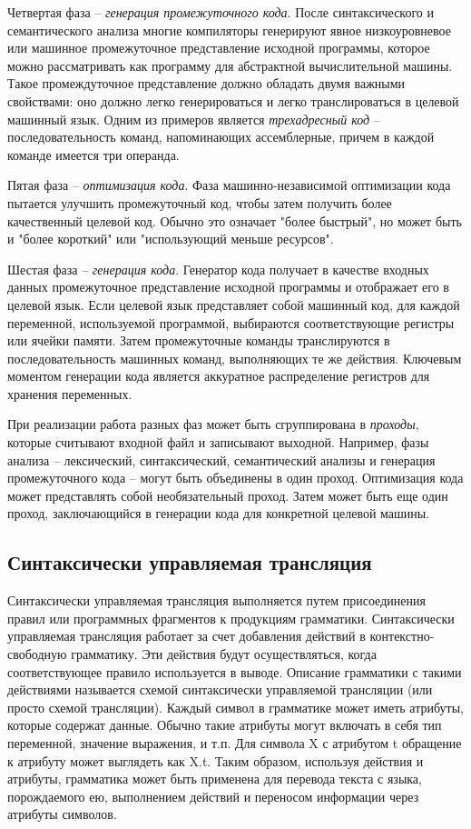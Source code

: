 \documentclass[a4paper,12pt]{article}
\begin{document}
Четвертая фаза -- \textit{генерация промежуточного кода}. После синтаксического и семантического анализа многие компиляторы генерируют явное низкоуровневое или машинное промежуточное представление исходной программы, которое можно рассматривать как программу для абстрактной вычислительной машины. Такое промеждуточное представление должно обладать двумя важными свойствами: оно должно легко генерироваться и легко транслироваться в целевой машинный язык. Одним из примеров является \textit{трехадресный код} -- последовательность команд, напоминающих ассемблерные, причем в каждой команде имеется три операнда.

Пятая фаза -- \textit{оптимизация кода}. Фаза машинно-независимой оптимизации кода пытается улучшить промежуточный код, чтобы затем получить более качественный целевой код. Обычно это означает "более быстрый", но может быть и "более короткий" или "использующий меньше ресурсов".

Шестая фаза -- \textit{генерация кода}. Генератор кода получает в качестве входных данных промежуточное представление исходной программы и отображает его в целевой язык. Если целевой язык представляет собой машинный код, для каждой переменной, используемой  программой, выбираются соответствующие регистры или ячейки памяти. Затем промежуточные команды транслируются в последовательность машинных команд, выполняющих те же действия. Ключевым моментом генерации кода является аккуратное распределение регистров для хранения переменных.

При реализации работа разных фаз может быть сгруппирована в \textit{проходы}, которые считывают входной файл и записывают выходной. Например, фазы анализа -- лексический, синтаксический, семантический анализы и генерация промежуточного кода -- могут быть объединены в один проход. Оптимизация кода может представлять собой необязательный проход. Затем может быть еще один проход, заключающийся в генерации кода для конкретной целевой машины.

\subsection{Синтаксически управляемая трансляция}

Синтаксически управляемая трансляция выполняется путем присоединения правил или программных фрагментов к продукциям грамматики. Синтаксически управляемая трансляция работает за счет добавления действий в контекстно-свободную грамматику. Эти действия будут осуществляться, когда соответствующее правило используется в выводе. Описание грамматики с такими действиями называется схемой синтаксически управляемой трансляции (или просто схемой трансляции). Каждый символ в грамматике может иметь атрибуты, которые содержат данные. Обычно такие атрибуты могут включать в себя тип переменной, значение выражения, и т.п. Для символа X с атрибутом t обращение к атрибуту может выглядеть как X.t. Таким образом, используя действия и атрибуты, грамматика может быть применена для перевода текста с языка, порождаемого ею, выполнением действий и переносом информации через атрибуты символов.
\end{document}
